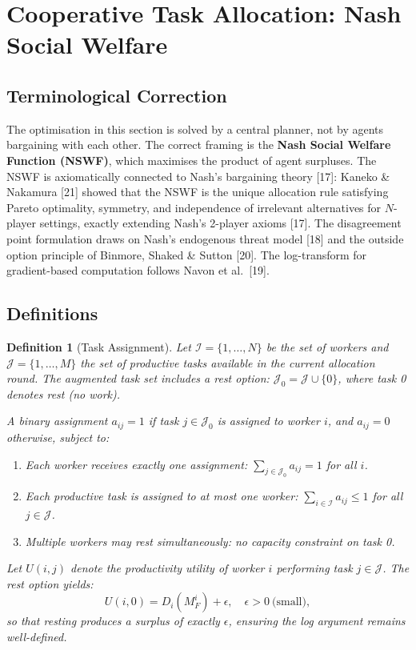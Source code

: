 \documentclass[11pt,a4paper]{article}
\newtheorem{definition}[theorem]{Definition}
\begin{document}
\section{Cooperative Task Allocation: Nash Social Welfare}\label{sec:nswf}

\subsection{Terminological Correction}

The optimisation in this section is solved by a central planner, not
by agents bargaining with each other. The correct framing is the
\textbf{Nash Social Welfare Function (NSWF)}, which maximises the
product of agent surpluses. The NSWF is axiomatically connected to
Nash's bargaining theory [17]: Kaneko \& Nakamura [21] showed that
the NSWF is the unique allocation rule satisfying Pareto optimality,
symmetry, and independence of irrelevant alternatives for $N$-player
settings, exactly extending Nash's 2-player axioms [17]. The
disagreement point formulation draws on Nash's endogenous threat
model [18] and the outside option principle of Binmore, Shaked \&
Sutton [20]. The log-transform for gradient-based computation follows
Navon et al.\ [19].

\subsection{Definitions}

\begin{definition}[Task Assignment]\label{def:task-assignment}
Let $\mathcal{I} = \{1,\ldots,N\}$ be the set of workers and
$\mathcal{J} = \{1,\ldots,M\}$ the set of productive tasks available
in the current allocation round. The augmented task set includes a
rest option: $\mathcal{J}_0 = \mathcal{J} \cup \{0\}$, where task 0
denotes rest (no work).

A binary assignment $a_{ij} = 1$ if task $j \in \mathcal{J}_0$ is
assigned to worker $i$, and $a_{ij} = 0$ otherwise, subject to:
\begin{enumerate}[label=(\roman*),noitemsep]
\item Each worker receives exactly one assignment: $\sum_{j \in \mathcal{J}_0} a_{ij} = 1$ for all $i$.
\item Each productive task is assigned to at most one worker: $\sum_{i \in \mathcal{I}} a_{ij} \leq 1$ for all $j \in \mathcal{J}$.
\item Multiple workers may rest simultaneously: no capacity constraint on task 0.
\end{enumerate}
Let $U(i, j)$ denote the productivity utility of worker $i$ performing
task $j \in \mathcal{J}$. The rest option yields:
\begin{equation}\label{eq:rest-utility}
U(i, 0) = D_i(M_F^i) + \epsilon, \quad \epsilon > 0\ \text{(small)},
\end{equation}
so that resting produces a surplus of exactly $\epsilon$, ensuring
the log argument remains well-defined.
\end{definition}
\end{document}
